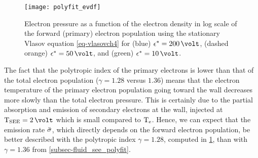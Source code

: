 \begin{figure}[hbt]
  \centering
  \texttt{[image: polyfit\_evdf]}
  \caption{Electron pressure as a function of the electron density in log scale of the forward (primary) electron population using the stationary Vlasov equation \cref{eq-vlasovch4} for (blue) $\crover=200\,\volt$, (dashed orange) $\crover=50\,\volt$, and (green) $\crover=10\,\volt$.}
  \label{fig-evdf_polyfit}
\end{figure}

The fact that the polytropic index of the primary electrons is lower than that of the total electron population ($\gamma=1.28$ versus $1.36$) means that the electron temperature of the primary electron population going toward the wall decreases more slowly than the total electron pressure.
This is certainly due to the partial absorption and emission of secondary electrons at the wall, injected at $\Tsee=2\,\volt$ which is small compared to $\mathrm{T_e}$.
Hence, we can expect that the emission rate $ \bar{\sigma }$, which directly depends on the forward electron population, be better described with the polytropic index $\gamma=1.28$, computed in \cref{fig-evdf_polyfit}, than with $\gamma=1.36$ from \cref{subsec-fluid_see_polyfit}.

